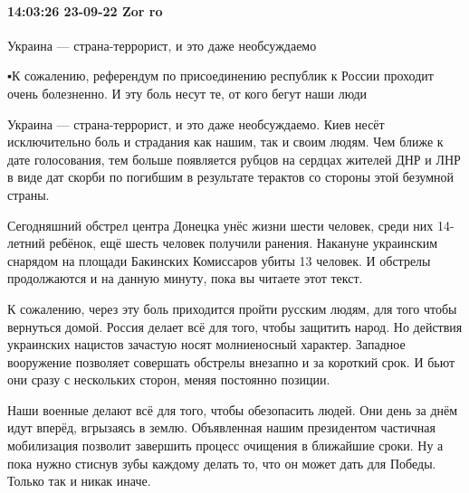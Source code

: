 \paragraph{14:03:26 23-09-22 Zor ro}
Украина — страна-террорист, и это даже необсуждаемо

▪К сожалению, референдум по присоединению республик к России проходит очень
болезненно. И эту боль несут те, от кого бегут наши люди

Украина — страна-террорист, и это даже необсуждаемо. Киев несёт исключительно
боль и страдания как нашим, так и своим людям. Чем ближе к дате голосования,
тем больше появляется рубцов на сердцах жителей ДНР и ЛНР в виде дат скорби по
погибшим в результате терактов со стороны этой безумной страны.

Сегодняшний обстрел центра Донецка унёс жизни шести человек, среди них
14-летний ребёнок, ещё шесть человек получили ранения. Накануне украинским
снарядом на площади Бакинских Комиссаров убиты 13 человек. И обстрелы
продолжаются и на данную минуту, пока вы читаете этот текст.

К сожалению, через эту боль приходится пройти русским людям, для того чтобы
вернуться домой. Россия делает всё для того, чтобы защитить народ. Но действия
украинских нацистов зачастую носят молниеносный характер. Западное вооружение
позволяет совершать обстрелы внезапно и за короткий срок. И бьют они сразу с
нескольких сторон, меняя постоянно позиции.

Наши военные делают всё для того, чтобы обезопасить людей. Они день за днём
идут вперёд, вгрызаясь в землю. Объявленная нашим президентом частичная
мобилизация позволит завершить процесс очищения в ближайшие сроки. Ну а пока
нужно стиснув зубы каждому делать то, что он может дать для Победы. Только так
и никак иначе.


